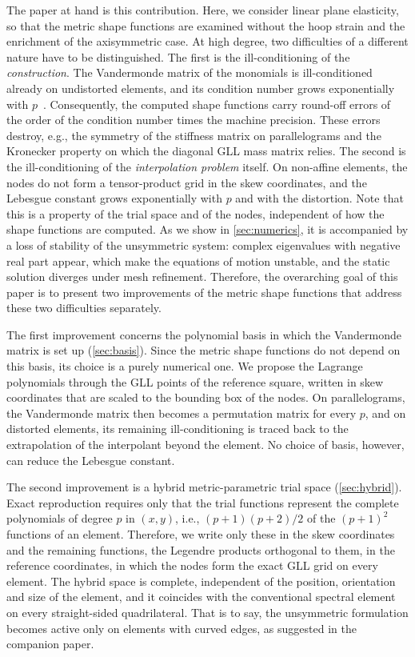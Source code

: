 The paper at hand is this contribution. Here, we consider linear plane elasticity, so that the metric shape functions are examined without the hoop strain and the enrichment of the axisymmetric case. At high degree, two difficulties of a different nature have to be distinguished. The first is the ill-conditioning of the \emph{construction}. The Vandermonde matrix of the monomials is ill-conditioned already on undistorted elements, and its condition number grows exponentially with $p$~\cite{Gautschi1988Lower}. Consequently, the computed shape functions carry round-off errors of the order of the condition number times the machine precision. These errors destroy, e.g., the symmetry of the stiffness matrix on parallelograms and the Kronecker property on which the diagonal GLL mass matrix relies. The second is the ill-conditioning of the \emph{interpolation problem} itself. On non-affine elements, the nodes do not form a tensor-product grid in the skew coordinates, and the Lebesgue constant grows exponentially with $p$ and with the distortion. Note that this is a property of the trial space and of the nodes, independent of how the shape functions are computed. As we show in \cref{sec:numerics}, it is accompanied by a loss of stability of the unsymmetric system: complex eigenvalues with negative real part appear, which make the equations of motion unstable, and the static solution diverges under mesh refinement. Therefore, the overarching goal of this paper is to present two improvements of the metric shape functions that address these two difficulties separately.

The first improvement concerns the polynomial basis in which the Vandermonde matrix is set up (\cref{sec:basis}). Since the metric shape functions do not depend on this basis, its choice is a purely numerical one. We propose the Lagrange polynomials through the GLL points of the reference square, written in skew coordinates that are scaled to the bounding box of the nodes. On parallelograms, the Vandermonde matrix then becomes a permutation matrix for every $p$, and on distorted elements, its remaining ill-conditioning is traced back to the extrapolation of the interpolant beyond the element. No choice of basis, however, can reduce the Lebesgue constant.

The second improvement is a hybrid metric-parametric trial space (\cref{sec:hybrid}). Exact reproduction requires only that the trial functions represent the complete polynomials of degree $p$ in $(x,y)$, i.e., $(p+1)(p+2)/2$ of the $(p+1)^2$ functions of an element. Therefore, we write only these in the skew coordinates and the remaining functions, the Legendre products orthogonal to them, in the reference coordinates, in which the nodes form the exact GLL grid on every element. The hybrid space is complete, independent of the position, orientation and size of the element, and it coincides with the conventional spectral element on every straight-sided quadrilateral. That is to say, the unsymmetric formulation becomes active only on elements with curved edges, as suggested in the companion paper.

